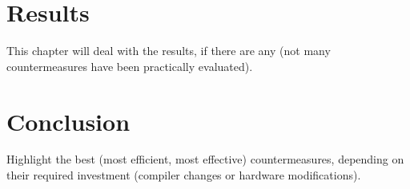 \chapter{Results}
This chapter will deal with the results, if there are any (not many countermeasures have been practically evaluated). 

\chapter{Conclusion}
Highlight the best (most efficient, most effective) countermeasures, depending on their required investment (compiler changes or hardware modifications).
